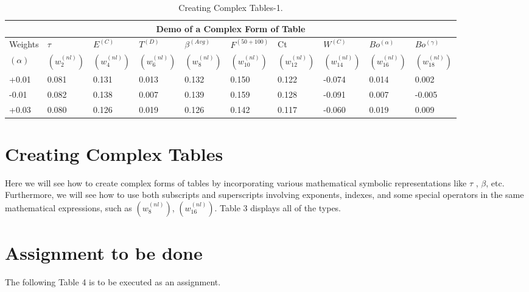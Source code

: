 \documentclass{article}
\begin{document}
\begin{table}
\centering
\begin{tabularx}{\textwidth}{|X|X|X|X|X|X|X|X|X|X|}
\hline
\multicolumn{10}{|c|}{Demo of a Complex Form of Table} \\
\hline
Weights & $\tau$ & $E^{(C)}$ & $T^{(D)}$ & $\beta^{(Avg)}$ & $F^{(50+100)}$ & Ct & $W^{(C)}$ & $Bo^{(\alpha)}$ & $Bo^{(\gamma)}$\\
$(\alpha)$ & $(w_{2}^{(nl)})$ & $(w_{4}^{(nl)})$ & $(w_{6}^{(nl)})$ & $(w_{8}^{(nl)})$ & $(w_{10}^{(nl)})$ & $(w_{12}^{(nl)})$ & $(w_{14}^{(nl)})$ & $(w_{16}^{(nl)})$ & $(w_{18}^{(nl)})$\\
\hline
+0.01 & 0.081 & 0.131 & 0.013 & 0.132 & 0.150 & 0.122 & -0.074 & 0.014 & 0.002 \\
-0.01 & 0.082 & 0.138 & 0.007 & 0.139 & 0.159 & 0.128 & -0.091 & 0.007 & -0.005 \\
+0.03 & 0.080 & 0.126 & 0.019 & 0.126 & 0.142 & 0.117 & -0.060 & 0.019 & 0.009 \\
\hline
\end{tabularx}
\caption{Creating Complex Tables-1.}
\label{tab:sample5}
\end{table}



\section{Creating Complex Tables}
Here we will see how to create complex forms of tables by incorporating various mathematical symbolic representations like $\tau$ , $\beta$, etc. Furthermore, we will see how to use both subscripts and superscripts involving exponents, indexes, and some special operators in the same mathematical expressions, such as $(w_{8}^{(nl)})$, $(w_{16}^{(nl)})$. Table 3 displays all of the types.


\section{Assignment to be done}
The following Table 4 is to be executed as an assignment.

\begin{table}[h!]
\centering
{}
\caption{Creating Complex Tables-2.}
\label{tab:sample5}
\end{table}
\end{document}
